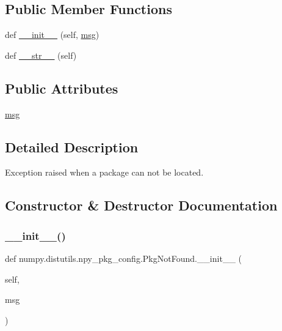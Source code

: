\subsection*{Public Member Functions}
\begin{DoxyCompactItemize}
\item 
def \hyperlink{classnumpy_1_1distutils_1_1npy__pkg__config_1_1PkgNotFound_a37bf69362d1f23c46b7eeb6efa60d248}{\+\_\+\+\_\+init\+\_\+\+\_\+} (self, \hyperlink{classnumpy_1_1distutils_1_1npy__pkg__config_1_1PkgNotFound_abf368c075d42d45bc680fe3915941fa3}{msg})
\item 
def \hyperlink{classnumpy_1_1distutils_1_1npy__pkg__config_1_1PkgNotFound_a27fefa2833d2502e664d6dc7bdf835f2}{\+\_\+\+\_\+str\+\_\+\+\_\+} (self)
\end{DoxyCompactItemize}
\subsection*{Public Attributes}
\begin{DoxyCompactItemize}
\item 
\hyperlink{classnumpy_1_1distutils_1_1npy__pkg__config_1_1PkgNotFound_abf368c075d42d45bc680fe3915941fa3}{msg}
\end{DoxyCompactItemize}


\subsection{Detailed Description}
\begin{DoxyVerb}Exception raised when a package can not be located.\end{DoxyVerb}
 

\subsection{Constructor \& Destructor Documentation}
\mbox{\label{classnumpy_1_1distutils_1_1npy__pkg__config_1_1PkgNotFound_a37bf69362d1f23c46b7eeb6efa60d248}} 
\subsubsection{\texorpdfstring{\+\_\+\+\_\+init\+\_\+\+\_\+()}{\_\_init\_\_()}}
{\footnotesize\ttfamily def numpy.\+distutils.\+npy\+\_\+pkg\+\_\+config.\+Pkg\+Not\+Found.\+\_\+\+\_\+init\+\_\+\+\_\+ (\begin{DoxyParamCaption}\item[{}]{self,  }\item[{}]{msg }\end{DoxyParamCaption})}



